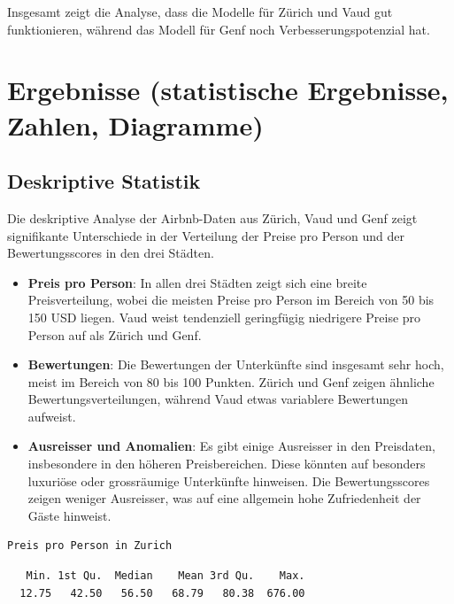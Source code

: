 \documentclass[
  journal,
]{IEEEtran}%
\begin{document}
Insgesamt zeigt die Analyse, dass die Modelle für Zürich und Vaud gut
funktionieren, während das Modell für Genf noch Verbesserungspotenzial
hat.

\hypertarget{ergebnisse-statistische-ergebnisse-zahlen-diagramme}{%
\section{Ergebnisse (statistische Ergebnisse, Zahlen,
Diagramme)}\label{ergebnisse-statistische-ergebnisse-zahlen-diagramme}}

\hypertarget{deskriptive-statistik-1}{%
\subsection{\texorpdfstring{\textbf{Deskriptive
Statistik}}{Deskriptive Statistik}}\label{deskriptive-statistik-1}}

Die deskriptive Analyse der Airbnb-Daten aus Zürich, Vaud und Genf zeigt
signifikante Unterschiede in der Verteilung der Preise pro Person und
der Bewertungsscores in den drei Städten.

\begin{itemize}
\item
  \textbf{Preis pro Person}: In allen drei Städten zeigt sich eine
  breite Preisverteilung, wobei die meisten Preise pro Person im Bereich
  von 50 bis 150 USD liegen. Vaud weist tendenziell geringfügig
  niedrigere Preise pro Person auf als Zürich und Genf.
\item
  \textbf{Bewertungen}: Die Bewertungen der Unterkünfte sind insgesamt
  sehr hoch, meist im Bereich von 80 bis 100 Punkten. Zürich und Genf
  zeigen ähnliche Bewertungsverteilungen, während Vaud etwas variablere
  Bewertungen aufweist.
\item
  \textbf{Ausreisser und Anomalien}: Es gibt einige Ausreisser in den
  Preisdaten, insbesondere in den höheren Preisbereichen. Diese könnten
  auf besonders luxuriöse oder grossräumige Unterkünfte hinweisen. Die
  Bewertungsscores zeigen weniger Ausreisser, was auf eine allgemein
  hohe Zufriedenheit der Gäste hinweist.
\end{itemize}

\begin{verbatim}
Preis pro Person in Zurich 
\end{verbatim}

\begin{verbatim}
   Min. 1st Qu.  Median    Mean 3rd Qu.    Max. 
  12.75   42.50   56.50   68.79   80.38  676.00 
\end{verbatim}
\end{document}

